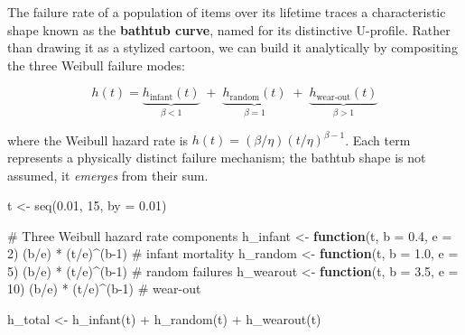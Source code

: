\documentclass[
  letterpaper,
  DIV=11,
  numbers=noendperiod]{scrreprt}
\newenvironment{Shaded}{\begin{snugshade}}{\end{snugshade}}
\newcommand{\AttributeTok}[1]{\textcolor[rgb]{0.40,0.45,0.13}{#1}}
\newcommand{\CommentTok}[1]{\textcolor[rgb]{0.37,0.37,0.37}{#1}}
\newcommand{\ControlFlowTok}[1]{\textcolor[rgb]{0.00,0.23,0.31}{\textbf{#1}}}
\newcommand{\DecValTok}[1]{\textcolor[rgb]{0.68,0.00,0.00}{#1}}
\newcommand{\FloatTok}[1]{\textcolor[rgb]{0.68,0.00,0.00}{#1}}
\newcommand{\FunctionTok}[1]{\textcolor[rgb]{0.28,0.35,0.67}{#1}}
\newcommand{\NormalTok}[1]{\textcolor[rgb]{0.00,0.23,0.31}{#1}}
\newcommand{\OtherTok}[1]{\textcolor[rgb]{0.00,0.23,0.31}{#1}}
\newcommand{\SpecialCharTok}[1]{\textcolor[rgb]{0.37,0.37,0.37}{#1}}
\begin{document}
The failure rate of a population of items over its lifetime traces a
characteristic shape known as the \textbf{bathtub curve}, named for its
distinctive U-profile. Rather than drawing it as a stylized cartoon, we
can build it analytically by compositing the three Weibull failure
modes:

\[h(t) = \underbrace{h_{\text{infant}}(t)}_{\beta < 1} \;+\; \underbrace{h_{\text{random}}(t)}_{\beta = 1} \;+\; \underbrace{h_{\text{wear-out}}(t)}_{\beta > 1}\]

where the Weibull hazard rate is
\(h(t) = (\beta/\eta)(t/\eta)^{\beta-1}\). Each term represents a
physically distinct failure mechanism; the bathtub shape is not assumed,
it \emph{emerges} from their sum.

\begin{Shaded}
\begin{Highlighting}[]
\NormalTok{t }\OtherTok{\textless{}{-}} \FunctionTok{seq}\NormalTok{(}\FloatTok{0.01}\NormalTok{, }\DecValTok{15}\NormalTok{, }\AttributeTok{by =} \FloatTok{0.01}\NormalTok{)}

\CommentTok{\# Three Weibull hazard rate components}
\NormalTok{h\_infant  }\OtherTok{\textless{}{-}} \ControlFlowTok{function}\NormalTok{(t, }\AttributeTok{b =} \FloatTok{0.4}\NormalTok{, }\AttributeTok{e =} \DecValTok{2}\NormalTok{)  (b}\SpecialCharTok{/}\NormalTok{e) }\SpecialCharTok{*}\NormalTok{ (t}\SpecialCharTok{/}\NormalTok{e)}\SpecialCharTok{\^{}}\NormalTok{(b}\DecValTok{{-}1}\NormalTok{)   }\CommentTok{\# infant mortality}
\NormalTok{h\_random  }\OtherTok{\textless{}{-}} \ControlFlowTok{function}\NormalTok{(t, }\AttributeTok{b =} \FloatTok{1.0}\NormalTok{, }\AttributeTok{e =} \DecValTok{5}\NormalTok{)  (b}\SpecialCharTok{/}\NormalTok{e) }\SpecialCharTok{*}\NormalTok{ (t}\SpecialCharTok{/}\NormalTok{e)}\SpecialCharTok{\^{}}\NormalTok{(b}\DecValTok{{-}1}\NormalTok{)   }\CommentTok{\# random failures}
\NormalTok{h\_wearout }\OtherTok{\textless{}{-}} \ControlFlowTok{function}\NormalTok{(t, }\AttributeTok{b =} \FloatTok{3.5}\NormalTok{, }\AttributeTok{e =} \DecValTok{10}\NormalTok{) (b}\SpecialCharTok{/}\NormalTok{e) }\SpecialCharTok{*}\NormalTok{ (t}\SpecialCharTok{/}\NormalTok{e)}\SpecialCharTok{\^{}}\NormalTok{(b}\DecValTok{{-}1}\NormalTok{)   }\CommentTok{\# wear{-}out}

\NormalTok{h\_total }\OtherTok{\textless{}{-}} \FunctionTok{h\_infant}\NormalTok{(t) }\SpecialCharTok{+} \FunctionTok{h\_random}\NormalTok{(t) }\SpecialCharTok{+} \FunctionTok{h\_wearout}\NormalTok{(t)}


\end{Highlighting}
\end{Shaded}
\end{document}
